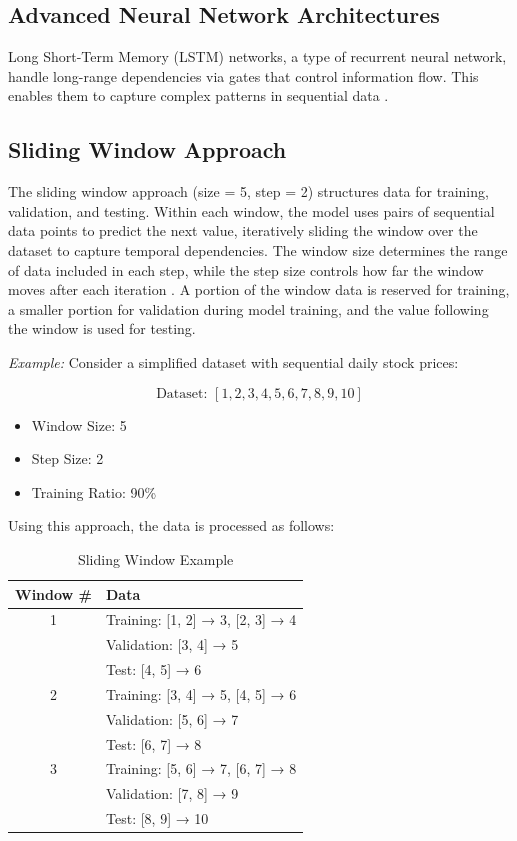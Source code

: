 \documentclass[10pt,twocolumn]{article}
\begin{document}
\subsection{Advanced Neural Network Architectures}

Long Short-Term Memory (LSTM) networks, a type of recurrent neural network, handle long-range dependencies via gates that control information flow. This enables them to capture complex patterns in sequential data \cite{Hochreiter1997LSTM, Fischer2017LSTMFinance}.

\subsection{Sliding Window Approach}

The sliding window approach (size = 5, step = 2) structures data for training, validation, and testing. Within each window, the model uses pairs of sequential data points to predict the next value, iteratively sliding the window over the dataset to capture temporal dependencies. The window size determines the range of data included in each step, while the step size controls how far the window moves after each iteration \cite{Zhan2024SlidingWindow}. A portion of the window data is reserved for training, a smaller portion for validation during model training, and the value following the window is used for testing.

\textit{Example:} Consider a simplified dataset with sequential daily stock prices:

\[
\text{Dataset: } [1, 2, 3, 4, 5, 6, 7, 8, 9, 10]
\]

\begin{itemize}
    \item Window Size: 5
    \item Step Size: 2
    \item Training Ratio: 90\%
\end{itemize}

Using this approach, the data is processed as follows:

\begin{table}[h]
    \centering
    \caption{Sliding Window Example}
    \label{tab:sliding_window_example}
    \begin{tabular}{|c|l|}
        \hline
        \textbf{Window \#} & \textbf{Data} \\
        \hline
        1 & Training: {[1, 2] → 3, [2, 3] → 4} \\
          & Validation: {[3, 4] → 5} \\
          & Test: {[4, 5] → 6} \\
        \hline
        2 & Training: {[3, 4] → 5, [4, 5] → 6} \\
          & Validation: {[5, 6] → 7} \\
          & Test: {[6, 7] → 8} \\
        \hline
        3 & Training: {[5, 6] → 7, [6, 7] → 8} \\
          & Validation: {[7, 8] → 9} \\
          & Test: {[8, 9] → 10} \\
        \hline
    \end{tabular}
\end{table}
\end{document}
